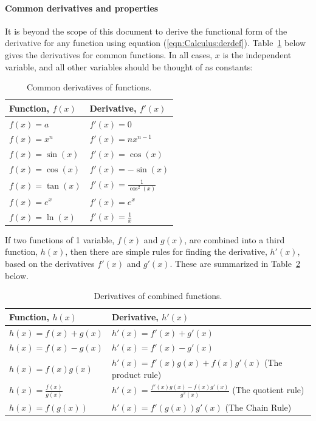 \paragraph{Common derivatives and properties}

It is beyond the scope of this document to derive the functional form of the derivative for any function using equation (\ref{eqn:Calculus:derdef}). Table~\ref{tab:Calculus:commonders} below gives the derivatives for common functions. In all cases, $x$ is the independent variable, and all other variables should be thought of as constants:

\begin{table}
\centering
\caption[]{Common derivatives of functions.}
\label{tab:Calculus:commonders}
\begin{tabular}{p{}p{}}
\toprule
\textbf{Function, $f(x)$} & \textbf{Derivative, $f'(x)$} \\
\hline
$f(x)=a$ & $f'(x)=0$ \\
$f(x)=x^n$ & $f'(x)=nx^{n -1}$ \\
$f(x)=\sin(x)$ & $f'(x)=\cos(x)$ \\
$f(x)=\cos(x)$ & $f'(x)= -\sin(x)$ \\
$f(x)=\tan(x)$ & $f'(x)=\frac{1}{\cos^2(x)}$ \\
$f(x)=e^x$ & $f'(x)=e^x$ \\
$f(x)=\ln(x)$ & $f'(x)=\frac{1}{x}$ \\
\bottomrule
\end{tabular}
\end{table}

If two functions of 1 variable, $f(x)$ and $g(x)$, are combined into a third function, $h(x)$, then there are simple rules for finding the derivative, $h'(x)$, based on the derivatives $f'(x)$ and $g'(x)$. These are summarized in Table~\ref{tab:Calculus:combders} below.

\begin{table}
\centering
\caption[]{Derivatives of combined functions.}
\label{tab:Calculus:combders}
\begin{tabular}{p{}p{}}
\toprule
\textbf{Function, $h(x)$} & \textbf{Derivative, $h'(x)$} \\
\hline
$h(x)=f(x)+g(x)$ & $h'(x)=f'(x)+g'(x)$ \\
$h(x)=f(x) -g(x)$ & $h'(x)=f'(x) -g'(x)$ \\
$h(x)=f(x)g(x)$ & $h'(x)=f'(x)g(x)+f(x)g'(x)$ (The product rule) \\
$h(x)=\frac{f(x)}{g(x)}$ & $h'(x)=\frac{f'(x)g(x) -f(x)g'(x)}{g^2(x)}$ (The quotient rule) \\
$h(x)=f(g(x))$ & $h'(x)=f'(g(x))g'(x)$ (The Chain Rule) \\
\bottomrule
\end{tabular}
\end{table}

